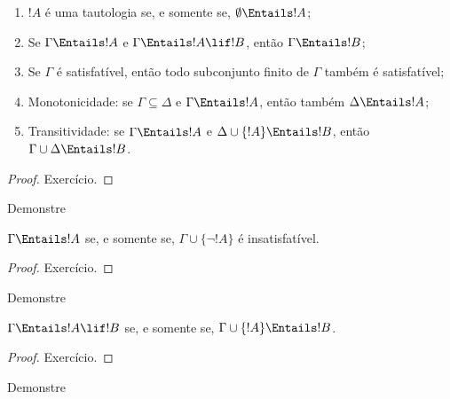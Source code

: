 \documentclass[../../../include/open-logic-section]{subfiles}
\begin{document}
\begin{prop}
\begin{enumerate} 
\item $!A$ é uma tautologia se, e somente se,
  $\emptyset \Entails !A$; 
\item Se $\Gamma \Entails !A$ e $\Gamma \Entails !A \lif !B$, então
  $\Gamma \Entails !B$;
\item Se $\Gamma$ é satisfatível, então todo subconjunto finito de $\Gamma$
  também é satisfatível; 
\item {} Monotonicidade: se $\Gamma \subseteq \Delta$
  e $\Gamma \Entails !A$, então também $\Delta \Entails !A$;
\item {} Transitividade: se $\Gamma \Entails !A$ e
  $\Delta \cup \{ !A\} \Entails !B$, então $\Gamma \cup \Delta \Entails
  !B$.
\end{enumerate}
\end{prop}

\begin{proof}
Exercício.
\end{proof}

\begin{prob}
Demonstre 
\end{prob}

\begin{prop}
  $\Gamma \Entails !A$ se, e somente se, $\Gamma \cup \{\lnot !A\}$
  é insatisfatível.
\end{prop}

\begin{proof}
Exercício.
\end{proof}

\begin{prob}
Demonstre 
\end{prob}

\begin{thm}
   $\Gamma \Entails !A \lif !B$ se, e somente
  se, $\Gamma \cup \{!A\} \Entails !B$.
\end{thm}

\begin{proof}
Exercício.
\end{proof}

\begin{prob}
Demonstre 
\end{prob}
\end{document}
